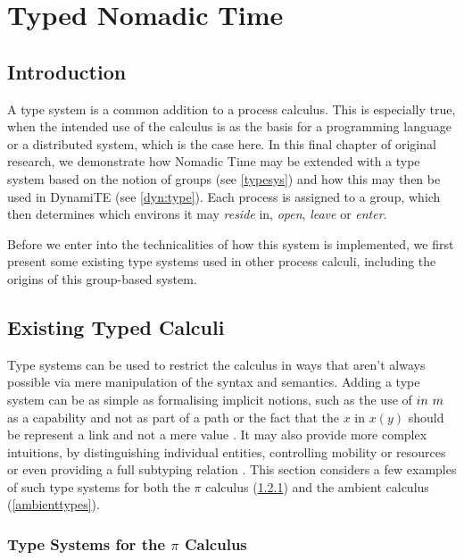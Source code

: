 
\chapter{Typed Nomadic Time}
\label{tnt}

\section{Introduction}

A type system is a common addition to a process calculus.  This is
especially true, when the intended use of the calculus is as the basis
for a programming language or a distributed system, which is the case
here.  In this final chapter of original research, we demonstrate how
Nomadic Time may be extended with a type system based on the notion of
groups (see \ref{typesys}) and how this may then be used in DynamiTE
(see \ref{dyn:type}).  Each process is assigned to a group, which then
determines which environs it may \emph{reside} in, \emph{open},
\emph{leave} or \emph{enter}.

Before we enter into the technicalities of how this system is
implemented, we first present some existing type systems used in other
process calculi, including the origins of this group-based system.

\section{Existing Typed Calculi}
\label{typedcalculi}

Type systems can be used to restrict the calculus in ways that aren't
always possible via mere manipulation of the syntax and semantics.
Adding a type system can be as simple as formalising implicit notions,
such as the use of $in\ m$ as a capability and not as part of a
path \cite{ambienttypes} or the fact that the $x$ in $x(y)$ should be
represent a link and not a mere value \cite{sangiorgi:types-or}.  It
may also provide more complex intuitions, by distinguishing individual
entities, controlling mobility \cite{sangiorgi:mobsafeambients,
  ambienttypes} or resources \cite{hennessy:dpi98} or even providing a
full subtyping relation \cite{sangiorgi:typing, boxedamb02}.  This
section considers a few examples of such type systems for both the
$\pi$ calculus (\ref{pitypes}) and the ambient calculus
(\ref{ambienttypes}).\subsection{Type Systems for the $\pi$ Calculus}
\label{pitypes}

